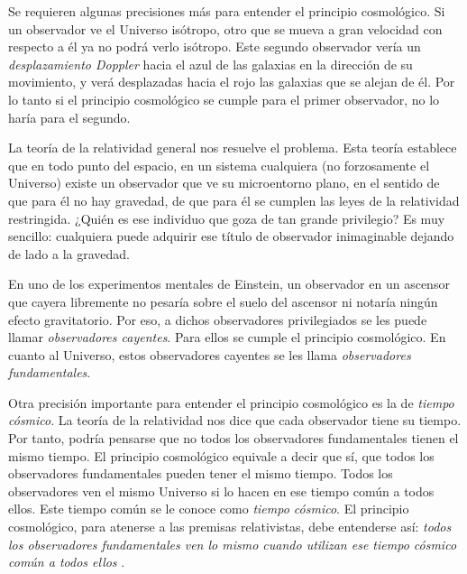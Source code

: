 \documentclass[a4paper,openright,12pt]{book}
\begin{document}
Se requieren algunas precisiones más para entender el principio cosmológico. Si un observador ve el Universo isótropo, otro que se mueva a gran velocidad con respecto a él ya no podrá verlo isótropo. Este segundo observador vería un \textit{desplazamiento Doppler} hacia el azul de las galaxias en la dirección de su movimiento, y verá desplazadas hacia el rojo las galaxias que se alejan de él. Por lo tanto si el principio cosmológico se cumple para el primer observador, no lo haría para el segundo.

La teoría de la relatividad general nos resuelve el problema. Esta teoría establece que en todo punto del espacio, en un sistema cualquiera (no forzosamente el Universo) existe un observador que ve su microentorno plano, en el sentido de que para él no hay gravedad, de que para él se cumplen las leyes de la relatividad restringida. ¿Quién es ese individuo que goza de tan grande privilegio? Es muy sencillo: cualquiera puede adquirir ese título de observador inimaginable dejando de lado a la gravedad.

En uno de los experimentos mentales de Einstein, un observador en un ascensor que cayera libremente no pesaría sobre el suelo del ascensor ni notaría ningún efecto gravitatorio. Por eso, a dichos observadores privilegiados se les puede llamar \textit{observadores cayentes}. Para ellos se cumple el principio cosmológico. En cuanto al Universo, estos observadores cayentes se les llama \textit{observadores fundamentales}.

Otra precisión importante para entender el principio cosmológico es la de \textit{tiempo cósmico}. La teoría de la relatividad nos dice que cada observador tiene su tiempo. Por tanto, podría pensarse que no todos los observadores fundamentales tienen el mismo tiempo. El principio cosmológico equivale a decir que sí, que todos los observadores fundamentales pueden tener el mismo tiempo. Todos los observadores ven el mismo Universo si lo hacen en ese tiempo común a todos ellos. Este tiempo común se le conoce como \textit{tiempo cósmico}. El principio cosmológico, para atenerse a las premisas relativistas, debe entenderse así: \textit{todos los observadores fundamentales ven lo mismo cuando utilizan ese tiempo cósmico común a todos ellos} \cite{1.02}.

\end{document}
